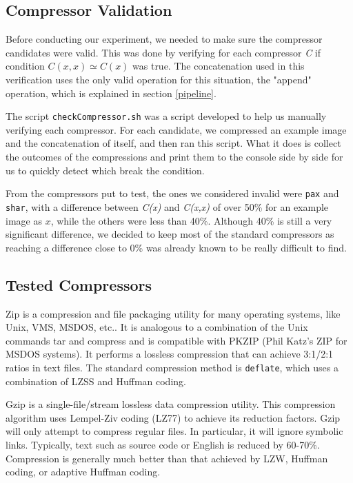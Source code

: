 \documentclass[12pt]{article}
\begin{document}
\subsection{Compressor Validation} \label{validation} %

Before conducting our experiment, we needed to make sure the compressor candidates were valid.
This was done by verifying for each compressor \textit{C} if condition $C(x,x) \simeq C(x)$ was true.
The concatenation used in this verification uses the only valid operation for this situation, the "append" operation, which is explained in section \ref{pipeline}.

The script \texttt{checkCompressor.sh} was a script developed to help us manually verifying each compressor.
For each candidate, we compressed an example image and the concatenation of itself, and then ran this script.
What it does is collect the outcomes of the compressions and print them to the console side by side for us to quickly detect which break the condition.

From the compressors put to test, the ones we considered invalid were \texttt{pax} and \texttt{shar}, with a difference between \textit{C(x)} and \textit{C(x,x)}
of over 50\% for an example image as $x$, while the others were less than 40\%.
Although 40\% is still a very significant difference, we decided to keep most of the standard compressors as reaching a difference close to 0\% was already
known to be really difficult to find.

\subsection{Tested Compressors} %

Zip is a compression and file packaging utility for many operating systems, like Unix, VMS, MSDOS, etc..  It is analogous to a combination of the Unix commands 
tar and compress and is compatible with PKZIP (Phil Katz's ZIP for MSDOS systems). It performs a lossless compression that can achieve 3:1/2:1 ratios in text files. 
The standard compression method is \texttt{deflate}, which uses a combination of LZSS and Huffman coding.

Gzip is a single-file/stream lossless data compression utility. This compression algorithm uses Lempel-Ziv coding (LZ77) to achieve its reduction factors. 
Gzip will only attempt to compress regular files. In particular, it will ignore symbolic links. Typically, text such as source code or English is reduced by 60-70\%. 
Compression is generally much better than that achieved by LZW, Huffman coding, or adaptive Huffman coding.
\end{document}
